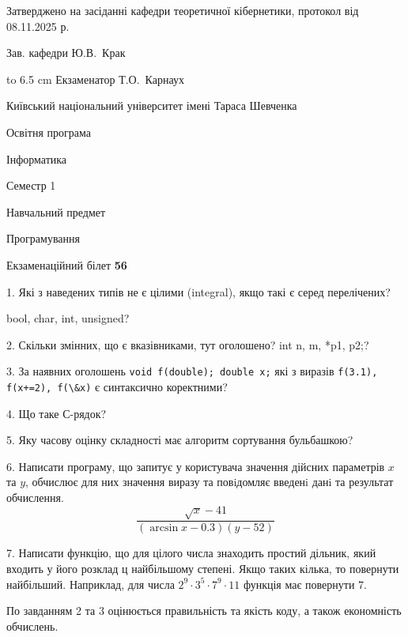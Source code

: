 \documentclass[12pt, ukrainian]{article}
\def\code#1{\Verb!#1!}
\begin{document}
{\smallskip\smallskip \begin {scriptsize} Затверджено на засіданні кафедри теоретичної кібернетики, протокол   від   08.11.2025 р.\par\smallskip\smallskip\smallskip\smallskip
{\parbox {6.5 cm} {Зав. кафедри \dotfill Ю.В.~Крак}}\hspace {0.7cm} {\hbox to 6.5 cm { Екзаменатор \dotfill Т.О.~Карнаух}} \end{scriptsize}}
\vspace{0.9cm}
{{\begin {scriptsize}\par
{ \center  Київський національний університет імені Тараса Шевченка \par}
{\parbox {5 cm}{Освітня програма \hfill}{\parbox {7 cm}{Інформатика\hfill}}\parbox {6 cm}{\hfill Семестр 1}}\par
{\parbox {5 cm} {Навчальний предмет \hfill}\parbox {7 cm}{Програмування \hfill}\parbox {6cm}{\hfill}\par}\vspace{-15pt} \end{scriptsize}}{\center Екзаменаційний білет \No \textbf { 56 }\par}}
{%
1. Які з наведених типів не є цілими (integral), якщо такі є серед перелічених?

bool, char, int, unsigned?
\par
\vspace{2mm}
2. Скільки змінних, що є вказівниками, тут оголошено?
int n, m, *p1, p2;?
\par
\vspace{2mm}
3. За наявних оголошень \code{void f(double); double x;} які з виразів \code{f(3.1), f(x+=2), f(\&x)} є синтаксично коректними?
\par
\vspace{2mm}
4. Що таке С-рядок?
\par
\vspace{2mm}
5. Яку часову оцінку складності має алгоритм сортування бульбашкою?
\par
\vspace{2mm}
6. Написати програму, що запитує у користувача значення дійсних параметрів $x$ та $y$, обчислює для них значення виразу та повiдомляє введенi данi та результат обчислення.
$$\frac{\sqrt x - 41}{(\arcsin x - 0.3) (y - 52)}$$ 

\par
7. Написати функцію, що для цілого числа знаходить простий дільник, який входить у його розклад ц найбільшому степені. Якщо таких кілька, то повернути найбільший. Наприклад, для числа $2^{9}{\cdot}3^5{\cdot}7^9{\cdot}11$ функція має повернути $7$.

По завданням 2 та 3 оцінюється правильність та якість коду, а також економність обчислень.

}
\end{document}
